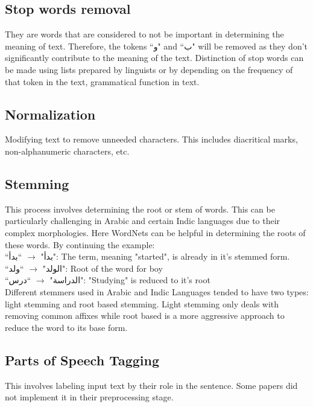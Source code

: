 \documentclass{article}
\begin{document}
	\subsection{Stop words removal}
	They are words that are considered to not be important in determining the meaning of text. Therefore, the tokens ``\textarabic{و}" and ``\textarabic{ب}" will be removed as they don't significantly contribute to the meaning of the text. Distinction of stop words can be made using lists prepared by linguists or by depending on the frequency of that token in the text, grammatical function in text.
	\subsection{Normalization}
	Modifying text to remove unneeded characters. This includes diacritical marks, non-alphanumeric characters, etc. 
	\subsection{Stemming}
	This process involves determining the root or stem of words. This can be particularly challenging in Arabic and certain Indic languages due to their complex morphologies. Here WordNets can be helpful in determining the roots of these words.
	By continuing the example: \\
	``\textarabic{بدأ}" $\rightarrow$ ``\textarabic{بدأ}": The term, meaning "started", is already in it's stemmed form. \\
	``\textarabic{الولد}" $\rightarrow$ ``\textarabic{ولد}": Root of the word for boy \\
	``\textarabic{الدراسة}" $\rightarrow$ 
	``\textarabic{درس}": "Studying" is reduced to it's root \\
	Different stemmers used in Arabic and Indic Languages tended to have two types: light stemming and root based stemming. Light stemming only deals with removing common affixes while root based is a more aggressive approach to reduce the word to its base form.
	
	\subsection{Parts of Speech Tagging}
	This involves labeling input text by their role in the sentence. Some papers did not implement it in their preprocessing stage.
	
\end{document}
